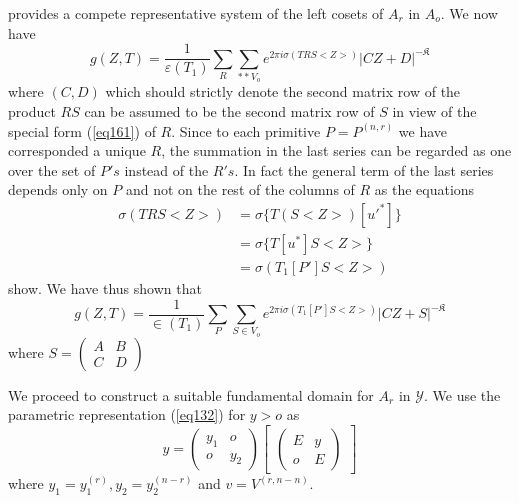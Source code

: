 provides a compete representative system of the left cosets of $A_r$
in $A_o$. We now have 
$$
g (Z, T) = \frac{1}{\varepsilon (T_1)} \sum_{R} \sum_{** V_o} e^{2 \pi
  i \sigma (TRS <Z>)} | CZ + D |^{-\mathfrak{K}} 
$$
where $(C, D)$ which should strictly denote the second matrix row of
the product $RS$ can be assumed to be the second matrix row of $S$ in
view of the special form (\ref{eq161}) of $R$. Since to each primitive $P =
P^{(n, r)}$ we have corresponded a unique $R$, the summation in the
last series can be regarded as one over the set of $P's$ instead of
the $R' s$. In fact the general term of the last series depends only
on $P$ and not on the rest of the columns of $R$ as the equations 
\begin{align*}
\sigma (TRS < Z >) &= \sigma \{ T (S < Z >) [ u'^* ] \} \\ 
&= \sigma \{ T [u^*] S <Z> \} \\
&= \sigma ( T_1 [P']  S<Z>)
\end{align*}
show. We have thus shown that 
\begin{equation*}
g(Z, T) = \frac{1}{\in (T_1)} \sum_{P} \sum_{S \in V_o} e^{2
  \pi i \sigma (T_1 [ P'] S <Z>)} | CZ +S |^{-\mathfrak{K}}
\tag{162}\label{eq162}  
\end{equation*}
where $S = \begin{pmatrix} A & B \\ C & D \end{pmatrix}$

We proceed to construct a suitable fundamental domain for $A_r$ in
$\mathscr{Y}$. We use the parametric representation (\ref{eq132}) for $y >
o$ as  
\begin{equation*}
y = 
\begin{pmatrix}
y_1 & o \\ 
o & y_2
\end{pmatrix}
\begin{bmatrix}
\begin{pmatrix}
E & y \\
o & E
\end{pmatrix}
\end{bmatrix} \tag*{$(132)'$}\label{eq132'}
\end{equation*}\pageoriginale
where $y_1 = y_1^{(r)}, y_2 = y_2^{(n -r)}$ and $v = V^{(r, n-n)}$. 

